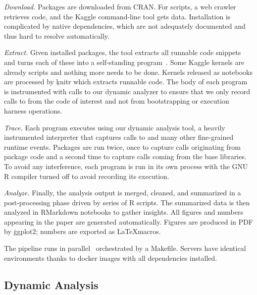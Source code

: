 \documentclass[review,screen,acmsmall,anonymous=true]{acmart}
\begin{document}
\medskip
\begin{compactenum}
\item \emph{Download.} Packages are downloaded from CRAN. For scripts, a web
  crawler retrieves code, and the Kaggle command-line tool gets data.
  Installation is complicated by native dependencies, which are not adequately
  documented and thus hard to resolve automatically.
\item \emph{Extract.} Given installed packages, the \genthat tool extracts all
  runnable code snippets and turns each of these into a self-standing
  program~\cite{issta18}. Some Kaggle kernels are already scripts and nothing
  more needs to be done. Kernels released as notebooks are processed by
  \c{knitr} which extracts runnable code. The body of each program is
  instrumented with calls to our dynamic analyzer to ensure that we only record
  calls to \eval from the code of interest and not from bootstrapping or
  execution harness operations.
\item \emph{Trace.} Each program executes using our dynamic analysis tool, a
  heavily instrumented interpreter that captures calls to \eval and many other
  fine-grained runtime events. Packages are run twice, once to capture \eval
  calls originating from package code and a second time to capture calls coming
  from the base libraries. To avoid any interference, each program is run in its
  own process with the GNU R compiler turned off to avoid recording its
  execution.
\item \emph{Analyze.} Finally, the analysis output is merged, cleaned, and summarized
  in a post-processing phase driven by series of R scripts. The summarized data
  is then analyzed in RMarkdown notebooks to gather insights. All figures and
  numbers appearing in the paper are generated automatically. Figures are
  produced in PDF by \c{ggplot2}; numbers are exported as \LaTeX macros.
\end{compactenum}

\noindent The pipeline runs in parallel~\cite{GNUparallel} orchestrated
by a Makefile. Servers have identical environments thanks to docker images with
all dependencies installed.

\subsection{Dynamic Analysis}
\end{document}
